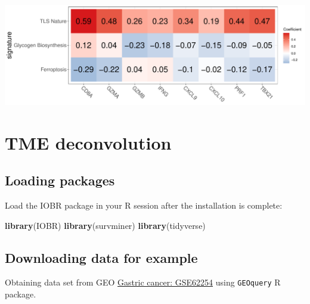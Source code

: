 \documentclass[
  12pt,
]{book}
\newenvironment{Shaded}{\begin{snugshade}}{\end{snugshade}}
\newcommand{\FunctionTok}[1]{\textcolor[rgb]{0.13,0.29,0.53}{\textbf{#1}}}
\newcommand{\NormalTok}[1]{#1}
\theoremstyle{definition}
\theoremstyle{definition}
\theoremstyle{definition}
\theoremstyle{definition}
\theoremstyle{remark}
\begin{document}
\includegraphics{_main_files/figure-latex/unnamed-chunk-56-1.pdf}

\hypertarget{tme-deconvolution}{%
\chapter{\texorpdfstring{\textbf{TME deconvolution}}{TME deconvolution}}\label{tme-deconvolution}}

\hypertarget{loading-packages-2}{%
\section{Loading packages}\label{loading-packages-2}}

Load the IOBR package in your R session after the installation is complete:

\begin{Shaded}
\begin{Highlighting}[]
\FunctionTok{library}\NormalTok{(IOBR)}
\FunctionTok{library}\NormalTok{(survminer)}
\FunctionTok{library}\NormalTok{(tidyverse)}
\end{Highlighting}
\end{Shaded}

\hypertarget{downloading-data-for-example-2}{%
\section{Downloading data for example}\label{downloading-data-for-example-2}}

Obtaining data set from GEO \href{https://pubmed.ncbi.nlm.nih.gov/25894828/}{Gastric cancer: GSE62254} using \texttt{GEOquery} R package.
\end{document}
